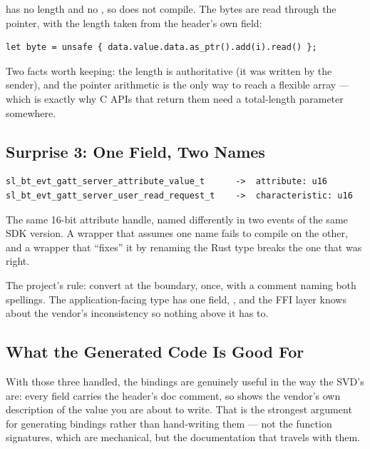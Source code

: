  has no length and no , so  does
not compile. The bytes are read through the pointer, with the length taken from the header's own
field:

\begin{verbatim}
let byte = unsafe { data.value.data.as_ptr().add(i).read() };
\end{verbatim}

Two facts worth keeping: the length is authoritative (it was written by the sender), and the pointer
arithmetic is the only way to reach a flexible array — which is exactly why C APIs that return them
need a total-length parameter somewhere.

\subsection{Surprise 3: One Field, Two Names}

\begin{verbatim}
sl_bt_evt_gatt_server_attribute_value_t      ->  attribute: u16
sl_bt_evt_gatt_server_user_read_request_t    ->  characteristic: u16
\end{verbatim}

The same 16-bit attribute handle, named differently in two events of the same SDK version. A wrapper
that assumes one name fails to compile on the other, and a wrapper that ``fixes'' it by renaming the
Rust type breaks the one that was right.

The project's rule: convert at the boundary, once, with a comment naming both spellings. The
application-facing type has one field, , and the FFI layer knows about the
vendor's inconsistency so nothing above it has to.

\subsection{What the Generated Code Is Good For}

With those three handled, the bindings are genuinely useful in the way the SVD's are: every field
carries the header's doc comment, so  shows the vendor's own description of the
value you are about to write. That is the strongest argument for generating bindings rather than
hand-writing them — not the function signatures, which are mechanical, but the documentation that
travels with them.
